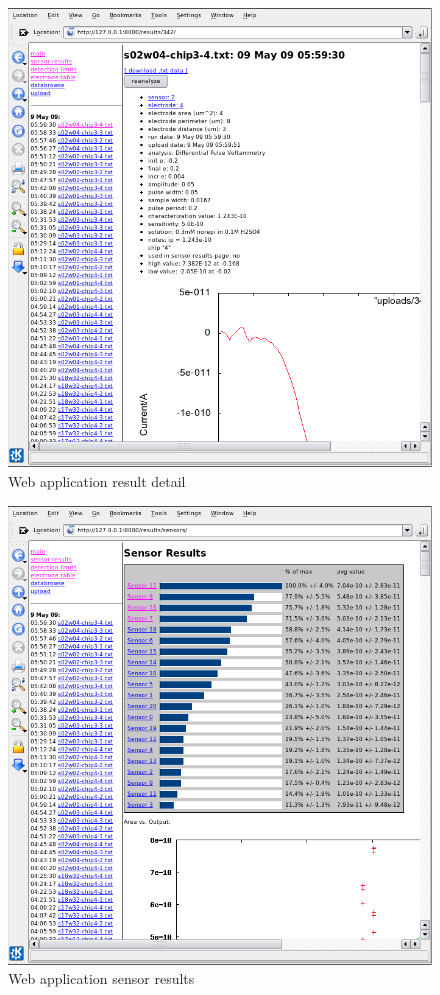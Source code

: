 \begin{figure}
	\centering
	\includegraphics[width=\linewidth]{figures/web-detail.png}
	\caption{Web application result detail}
\end{figure}

\begin{figure}
	\centering
	\includegraphics[width=\linewidth]{figures/web-sensors.png}
	\caption{Web application sensor results}
\end{figure}

